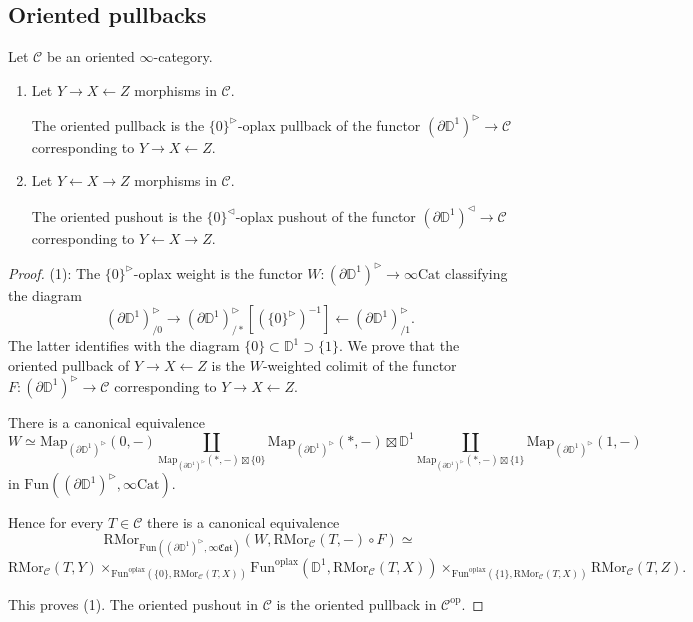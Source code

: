 \documentclass[10pt,oneside]{article}
\numberwithin{equation}{section} %
\numberwithin{figure}{section} %
\theoremstyle{plain}
\theoremstyle{definition}
\newcommand{\bD}{{\mathbb D}}
\newcommand{\mC}{{\mathcal C}}
\newcommand{\op}{\mathrm{op}}
\newcommand{\Cat}{\mathrm{Cat}}
\newcommand{\Fun}{\mathrm{Fun}}
\newcommand{\oplax}{{\mathrm{oplax}}}
\newcommand{\Map}{{\mathrm{Map}}}
\newcommand{\RMor}{\mathrm{RMor}}
\newcommand{\fcat}{\mathfrak{Cat}}
\begin{document}
\subsection{Oriented pullbacks}

\begin{proposition}

Let $\mC$ be an oriented $\infty$-category.

\begin{enumerate}[\normalfont(1)]\setlength{\itemsep}{-2pt}

\item Let $Y \to X \leftarrow Z$ morphisms in $\mC.$

The oriented pullback is the $\{0\}^{\triangleright} $-oplax pullback 
of the functor $(\partial\bD^1)^{\triangleright} \to \mC $
corresponding to $Y \to X \leftarrow Z$.

\item Let $Y \leftarrow X \to Z$ morphisms in $\mC.$

The oriented pushout is the $\{0\}^{\triangleleft} $-oplax pushout 
of the functor $(\partial\bD^1)^{\triangleleft} \to \mC $
corresponding to $Y \leftarrow X \to Z. $
    
\end{enumerate}
    
\end{proposition}

\begin{proof}

(1): The $\{0\}^{\triangleright} $-oplax weight is the functor 
$W: (\partial\bD^1)^{\triangleright} \to \infty\Cat$ classifying the diagram 
$$ (\partial\bD^1)^{\triangleright}_{/0} \to (\partial\bD^1)_{/*}^{\triangleright}[(\{0\}^{\triangleright})^{-1}] \leftarrow (\partial\bD^1)^{\triangleright}_{/1}.$$ The latter identifies with the diagram $ \{0\} \subset \bD^1 \supset \{1\}$.
We prove that the oriented pullback of $Y \to X \leftarrow Z$ is the $W$-weighted colimit of the functor $F: (\partial\bD^1)^{\triangleright} \to \mC $
corresponding to $Y \to X \leftarrow Z$.

There is a canonical equivalence
$$ W \simeq \Map_{(\partial\bD^1)^{\triangleright}}(0,-) \coprod_{\Map_{(\partial\bD^1)^{\triangleright}}(*,-) \boxtimes \{ 0\}} \Map_{(\partial\bD^1)^{\triangleright}}(*,-) \boxtimes \bD^1 \coprod_{\Map_{(\partial\bD^1)^{\triangleright}}(*,-) \boxtimes \{ 1\}} \Map_{(\partial\bD^1)^{\triangleright}}(1,-)$$
in $\Fun((\partial\bD^1)^{\triangleright}, \infty\Cat).$

Hence for every $T \in \mC$ there is a canonical equivalence
$$ \RMor_{\Fun((\partial\bD^1)^{\triangleright}, \infty\fcat)}(W, \RMor_{\mC}(T,-) \circ F) \simeq $$
$$ \RMor_{\mC}(T, Y) \times_{\Fun^\oplax(\{0 \},\RMor_{\mC}(T, X))}  \Fun^\oplax(\bD^1, \RMor_{\mC}(T, X))  \times_{\Fun^\oplax(\{1 \},\RMor_{\mC}(T, X))} \RMor_{\mC}(T, Z).$$

This proves (1). The oriented pushout in $\mC$ is the oriented pullback in $\mC^\op.$
\end{proof}
\end{document}
